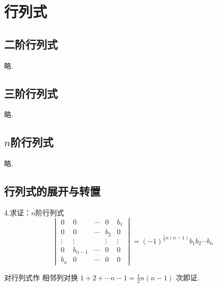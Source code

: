\chapter{行列式}
\section{二阶行列式}
略.
\section{三阶行列式}
略.
\section{\texorpdfstring{$n$}{n}阶行列式}
略.
\section{行列式的展开与转置}
4.求证：$n$阶行列式
\[
\begin{vmatrix}
	0 & 0 & \cdots & 0 & b_1 \\
	0 & 0 & \cdots & b_2 & 0 \\
	\vdots & \vdots & &\vdots &\vdots\\
	0 & b_{n- 1} &\cdots &0 & 0\\
	b_n & 0 &\cdots&0&0
\end{vmatrix}
=\left(-1\right)^{\tfrac{1}{2}
n\left(n- 1\right)}
b_1b_2\cdots b_n
\]
\begin{Proof}
对行列式作
相邻列对换
$\displaystyle 
1 +2+ \cdots n -
 1 = \frac{1}{2}n\left(n- 1\right)$
次即证.
\end{Proof}

